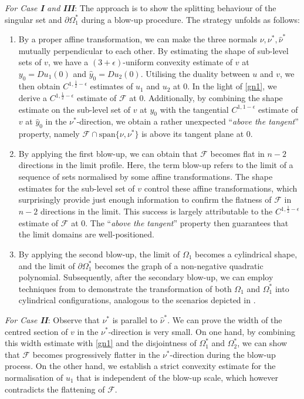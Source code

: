 \documentclass[11pt]{amsart}
\theoremstyle{plain}
\newcommand{\0}{\textbf{0}}
\numberwithin{equation}{section}
\numberwithin{equation}{section}
\numberwithin{figure}{section}
\begin{document}
\textit{For Case \textbf{I} and \textbf{III}}: The approach is to show the splitting behaviour of the singular set and $\partial\Omega_1^*$ during a blow-up procedure. The strategy unfolds as follows:
\begin{enumerate}
     \item By a proper affine transformation, we can make the three normals $\nu, \nu^*, \hat\nu^*$ mutually perpendicular to each other. By estimating the shape of sub-level sets of \(v\), we have a \((3+\epsilon)\)-uniform convexity estimate of \(v\) at \(y_0 = Du_1(0)\) and \(\hat y_0 = Du_2(0)\). Utilising the duality between \(u\) and \(v\), we then obtain \(C^{1,\frac{1}{2}-\epsilon}\) estimates of \(u_1\) and \(u_2\) at $0$. In the light of \eqref{gn1}, we derive a \(C^{1,\frac{1}{2}-\epsilon}\) estimate of \(\mathcal{F}\) at $0$. Additionally, by combining the shape estimate on the sub-level set of $v$ at $y_0$ with the tangential \(C^{1, 1-\epsilon}\) estimate of \(v\) at \(\hat y_0\) in the \(\nu^*\)-direction, we obtain a rather unexpected ``\emph{above the tangent}'' property, namely \(\mathcal{F}\cap\text{span}\{\nu, \nu^*\}\) is above its tangent plane at \(0.\)

     
    \item 
    By applying the first blow-up, we can obtain that $\mathcal{F}$ becomes flat in $n-2$ directions in the limit profile. Here, the term blow-up refers to the limit of a sequence of sets normalised by some affine transformations. The shape estimates for the sub-level set of $v$ control these affine transformations, which surprisingly provide just enough information to confirm the flatness of $\mathcal{F}$ in $n-2$ directions in the limit. This success is largely attributable to the $C^{1,\frac{1}{2}-\epsilon}$ estimate of $\mathcal{F}$ at $0$. The ``\emph{above the tangent}'' property then guarantees that the limit domains are well-positioned. 

    \item 
    By applying the second blow-up, the limit of $\Omega_1$ becomes a cylindrical shape, and the limit of $\partial\Omega_1^*$ becomes the graph of a non-negative quadratic polynomial. Subsequently, after the secondary blow-up, we can employ techniques from \cite{CLW1, CLW3} to demonstrate the transformation of both $\Omega_1$ and $\Omega_1^*$ into cylindrical configurations, analogous to the scenarios depicted in \cite{CLW1}.
\end{enumerate}


\textit{For Case \textbf{II}}: Observe that $\nu^*$ is parallel to $\hat\nu^*$. We can prove the width of the centred section of $v$ in the $\nu^*$-direction is very small. On one hand, by combining this width estimate with \eqref{gn1} and the disjointness of $\Omega_1^*$ and $\Omega_2^*$, we can show that $\mathcal{F}$ becomes progressively flatter in the $\nu^*$-direction during the blow-up process. On the other hand, we establish a strict convexity estimate for the normalisation of $u_1$ that is independent of the blow-up scale, which however contradicts the flattening of $\mathcal{F}$. 
\end{document}
